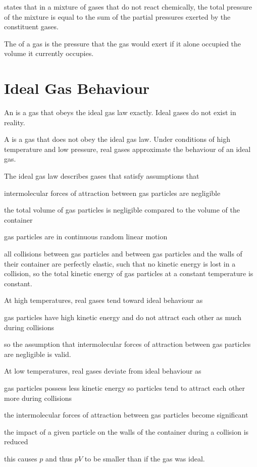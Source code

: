 \documentclass[Chemistry.tex]{subfiles}
\begin{document}
 states that in a mixture of gases that do not react chemically, the total pressure of the mixture is equal to the sum of the partial pressures exerted by the constituent gases.

The  of a gas is the pressure that the gas would exert if it alone occupied the volume it currently occupies.
\section{Ideal Gas Behaviour}
An  is a gas that obeys the ideal gas law exactly. Ideal gases do not exist in reality.

A  is a gas that does not obey the ideal gas law. Under conditions of high temperature and low pressure, real gases approximate the behaviour of an ideal gas.

The ideal gas law describes gases that satisfy assumptions that \begin{slinenum}
\item intermolecular forces of attraction between gas particles are negligible
\item the total volume of gas particles is negligible compared to the volume of the container
\item gas particles are in continuous random linear motion
\item all collisions between gas particles and between gas particles and the walls of their container are perfectly elastic, such that no kinetic energy is lost in a collision, so the total kinetic energy of gas particles at a constant temperature is constant.
\end{slinenum}

At high temperatures, real gases tend toward ideal behaviour as \begin{slinenum}
\item gas particles have high kinetic energy and do not attract each other as much during collisions
\item so the assumption that intermolecular forces of attraction between gas particles are negligible is valid.
\end{slinenum}

At low temperatures, real gases deviate from ideal behaviour as \begin{slinenum}
\item gas particles possess less kinetic energy so particles tend to attract each other more during collisions
\item the intermolecular forces of attraction between gas particles become significant
\item the impact of a given particle on the walls of the container during a collision is reduced
\item this causes \(p\) and thus \(pV\) to be smaller than if the gas was ideal.
\end{slinenum}
\end{document}
